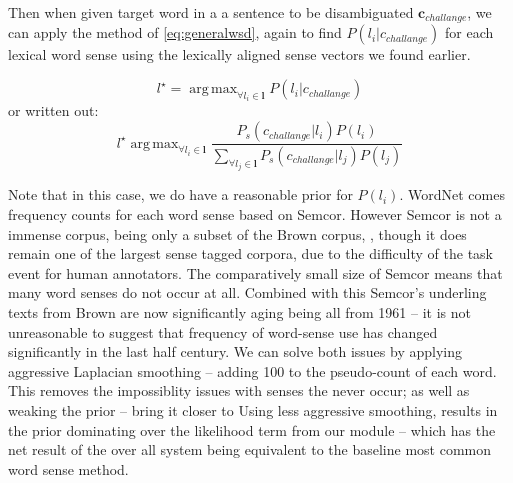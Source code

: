 \documentclass{sig-alternate}
\renewcommand{\c}{\mathbf{c}}
\renewcommand{\l}{\mathbf{l}}
\DeclareMathOperator*{\argmax}{arg\,max}
\begin{document}
Then when given target word in a a sentence to be disambiguated $\c_{challange}$, we can apply the method of \cref{eq:generalwsd}, again to find $P(l_i|c_{challange})$ for each lexical word sense using the lexically aligned sense vectors we found earlier.

\begin{equation}\label{eq:lexicalwsd}
l^\star = \argmax_{\forall l_i \in \l} P(l_i|c_{challange})
\end{equation}
or written out:
\begin{equation}\label{eq:lexicalwsdexpanded}
l^\star \argmax_{\forall l_i \in \l} \frac{P_s(c_{challange}|l_i)P(l_i)}{\sum_{\forall l_j \in \l} P_s(c_{challange}|l_j)P(l_j)}
\end{equation}

Note that in this case, we do have a reasonable prior for $P(l_i)$.
WordNet comes frequency counts for each word sense based on Semcor\cite{tengi1998design}.
However Semcor is not a immense corpus, being only a subset of the Brown corpus, , though it does remain one of the largest sense tagged corpora, due to the difficulty of the task event for human annotators.
The comparatively small size of Semcor means that many word senses do not occur at all.
Combined with this Semcor's underling texts from Brown are now significantly aging being all from 1961 -- it is not unreasonable to suggest that frequency of word-sense use has changed significantly in the last half century.
We can solve both issues by applying aggressive Laplacian smoothing -- adding 100 to the pseudo-count of each word. This removes the impossiblity issues with senses the never occur; as well as weaking the prior -- bring it closer to 
Using less aggressive smoothing, results in the prior dominating over the likelihood term from our module -- which has the net result of the over all system being equivalent to the baseline most common word sense method.


\printbibliography
\end{document}

